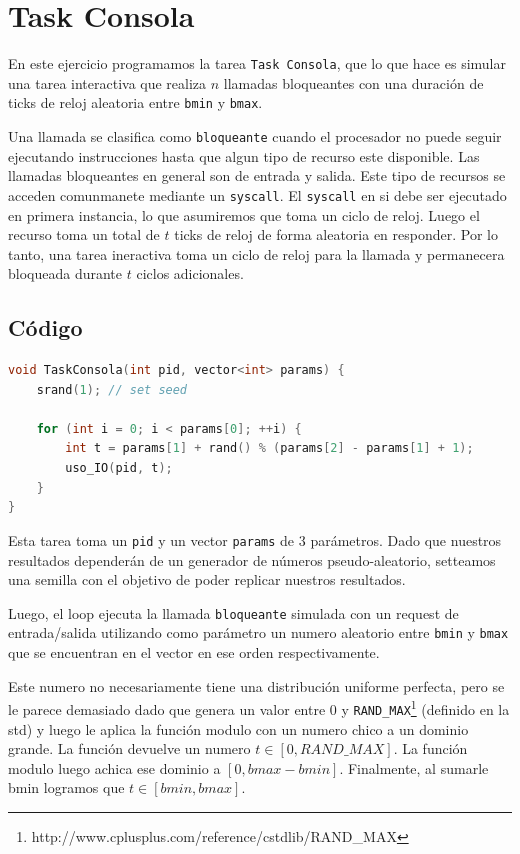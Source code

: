 \section{Task Consola}

En este ejercicio programamos la tarea \texttt{Task Consola}, que lo que hace es simular una tarea interactiva que realiza $n$ llamadas bloqueantes con una duración de ticks de reloj aleatoria entre \texttt{bmin} y \texttt{bmax}.

Una llamada se clasifica como \texttt{bloqueante} cuando el procesador no puede seguir ejecutando instrucciones hasta que algun tipo de recurso este disponible. Las llamadas bloqueantes en general son de entrada y salida. Este tipo de recursos se acceden comunmanete mediante un \texttt{syscall}. El \texttt{syscall} en si debe ser ejecutado en primera instancia, lo que asumiremos que toma un ciclo de reloj. Luego el recurso toma un total de $t$ ticks de reloj de forma aleatoria en responder. Por lo tanto, una tarea ineractiva toma un ciclo de reloj para la llamada y permanecera bloqueada durante $t$ ciclos adicionales.

\subsection{Código}

\begin{lstlisting}[language=C++, breaklines=true]
void TaskConsola(int pid, vector<int> params) {
	srand(1); // set seed

	for (int i = 0; i < params[0]; ++i) {
		int t = params[1] + rand() % (params[2] - params[1] + 1);
		uso_IO(pid, t);
	}
}
\end{lstlisting}

Esta tarea toma un \texttt{pid} y un vector \texttt{params} de 3 parámetros. Dado que nuestros resultados dependerán de un generador de números pseudo-aleatorio, setteamos una semilla con el objetivo de poder replicar nuestros resultados.

Luego, el loop ejecuta la llamada \texttt{bloqueante} simulada con un request de entrada/salida utilizando como parámetro un numero aleatorio entre \texttt{bmin} y \texttt{bmax} que se encuentran en el vector en ese orden respectivamente.

Este numero no necesariamente tiene una distribución uniforme perfecta, pero se le parece demasiado dado que genera un valor entre $0$ y \texttt{RAND\_MAX}\footnote{http://www.cplusplus.com/reference/cstdlib/RAND\_MAX} (definido en la std) y luego le aplica la función modulo con un numero chico a un dominio grande. La función devuelve un numero $t \in [0, RAND\_MAX]$. La función modulo luego achica ese dominio a $[0, bmax - bmin]$. Finalmente, al sumarle bmin logramos que $t \in [bmin, bmax]$.

